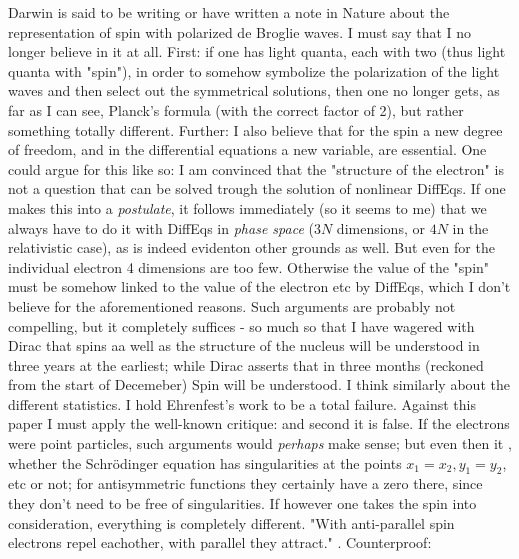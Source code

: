 \documentclass{article}
\begin{document}
Darwin is said to be writing or have written a note in Nature about the representation of spin with polarized de Broglie waves. I must say that I no longer believe in it at all. First: if one has light quanta, each with two  (thus light quanta with "spin"), in order to somehow symbolize the polarization of the light waves and then select out the symmetrical solutions, then one no longer gets, as far as I can see, Planck's formula (with the correct factor of 2), but rather something totally different. Further: I also believe that for the spin a new degree of freedom, and in the differential equations a new variable, are essential. One could argue for this like so: I am convinced that the "structure of the electron" is not a question that can be solved trough the solution of nonlinear DiffEqs. If one makes this into a \textit{postulate}, it follows immediately (so it seems to me) that we always have to do it with DiffEqs in \textit{phase space} ($3N$ dimensions, or $4N$ in the relativistic case), as is indeed evidenton other grounds as well. But even for the individual electron 4 dimensions are too few. Otherwise the value of the "spin" must be somehow linked to the value of the electron etc by DiffEqs, which I don't believe for the aforementioned reasons. Such arguments are probably not compelling, but  it completely suffices - so much so that I have wagered with Dirac that spins aa well as the structure of the nucleus will be understood in three years at the earliest; while Dirac asserts that in three months (reckoned from the start of Decemeber) Spin will be understood. I think similarly about the different statistics. I hold Ehrenfest's work to be a total failure. Against this paper I must apply the well-known critique:  and second it is false. If the electrons were point particles, such arguments would \textit{perhaps} make sense; but even then it , whether the Schr\"odinger equation has singularities at the points $x_1=x_2,y_1=y_2$, etc or not; for antisymmetric functions they certainly have a zero there, since they don't need to be free of singularities. If however one takes the spin into consideration, everything is completely different. "With anti-parallel spin electrons repel eachother, with parallel they attract." . Counterproof:
\end{document}
